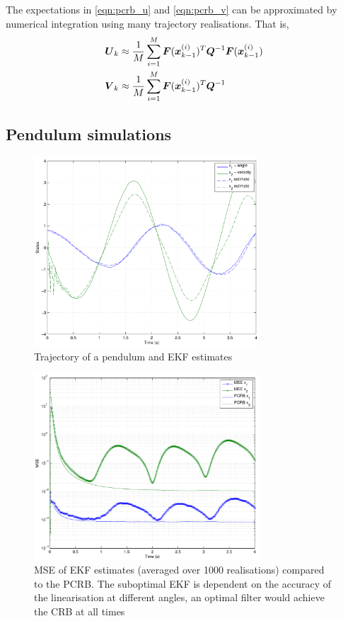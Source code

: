 \documentclass{article}
\begin{document}
The expectations in \eqref{eqn:pcrb_u} and \eqref{eqn:pcrb_v} can be approximated by numerical integration using many trajectory realisations. That is,
\begin{align}
	\boldsymbol{U}_k &\approx \frac{1}{M}\sum_{i=1}^M \boldsymbol{F}({\boldsymbol x}_{k-1}^{(i)})^T\boldsymbol{Q}^{-1} \boldsymbol{F}({\boldsymbol x}_{k-1}^{(i)}) \\
	\boldsymbol{V}_k &\approx \frac{1}{M}\sum_{i=1}^M \boldsymbol{F}({\boldsymbol x}_{k-1}^{(i)})^T\boldsymbol{Q}^{-1} 
\end{align}


\subsection{Pendulum simulations}

\begin{figure}[H]
	\centering
	\includegraphics[width=0.75\textwidth]{figures/pendulum_trajectory}
	\caption{Trajectory of a pendulum and EKF estimates}
\end{figure}
\begin{figure}[H]
	\centering
	\includegraphics[width=0.75\textwidth]{figures/pendulum_pcrb}
	\caption{MSE of EKF estimates (averaged over 1000 realisations) compared to the PCRB. The suboptimal EKF is dependent on the accuracy of the linearisation at different angles, an optimal filter would achieve the CRB at all times}
\end{figure}

% 
% 
\end{document}
